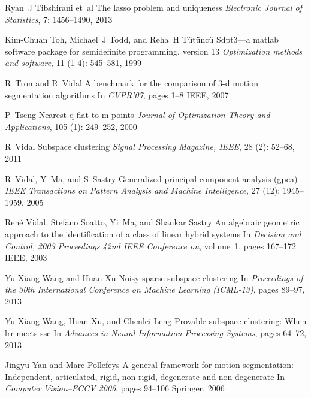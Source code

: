 \documentclass[12pt,heading]{ctexbook}
\begin{document}
\begin{thebibliography}{99}
    Ryan~J Tibshirani et~al
    \newblock The lasso problem and uniqueness
    \newblock \emph{Electronic Journal of Statistics}, 7: 1456--1490,
    2013

    Kim-Chuan Toh, Michael~J Todd, and Reha~H T{\"u}t{\"u}nc{\"u}
    \newblock Sdpt3—a matlab software package for semidefinite programming,
    version 13
    \newblock \emph{Optimization methods and software}, 11 (1-4):
    545--581, 1999

    R~Tron and R~Vidal
    \newblock A benchmark for the comparison of 3-d motion segmentation algorithms
    \newblock In \emph{CVPR'07}, pages 1--8 IEEE, 2007

    P~Tseng
    \newblock Nearest q-flat to m points
    \newblock \emph{Journal of Optimization Theory and Applications}, 105
    (1): 249--252, 2000

    R~Vidal
    \newblock Subspace clustering
    \newblock \emph{Signal Processing Magazine, IEEE}, 28 (2):
    52--68, 2011

    R~Vidal, Y~Ma, and S~Sastry
    \newblock Generalized principal component analysis (gpca)
    \newblock \emph{IEEE Transactions on Pattern Analysis and Machine
    Intelligence}, 27 (12): 1945--1959, 2005

    Ren{\'e} Vidal, Stefano Soatto, Yi~Ma, and Shankar Sastry
    \newblock An algebraic geometric approach to the identification of a class of
    linear hybrid systems
    \newblock In \emph{Decision and Control, 2003 Proceedings 42nd IEEE
    Conference on}, volume~1, pages 167--172 IEEE, 2003

    Yu-Xiang Wang and Huan Xu
    \newblock Noisy sparse subspace clustering
    \newblock In \emph{Proceedings of the 30th International Conference on Machine
    Learning (ICML-13)}, pages 89--97, 2013

    Yu-Xiang Wang, Huan Xu, and Chenlei Leng
    \newblock Provable subspace clustering: When lrr meets ssc
    \newblock In \emph{Advances in Neural Information Processing Systems}, pages
    64--72, 2013

    Jingyu Yan and Marc Pollefeys
    \newblock A general framework for motion segmentation: Independent,
    articulated, rigid, non-rigid, degenerate and non-degenerate
    \newblock In \emph{Computer Vision--ECCV 2006}, pages 94--106 Springer, 2006


\end{thebibliography}
\end{document}
